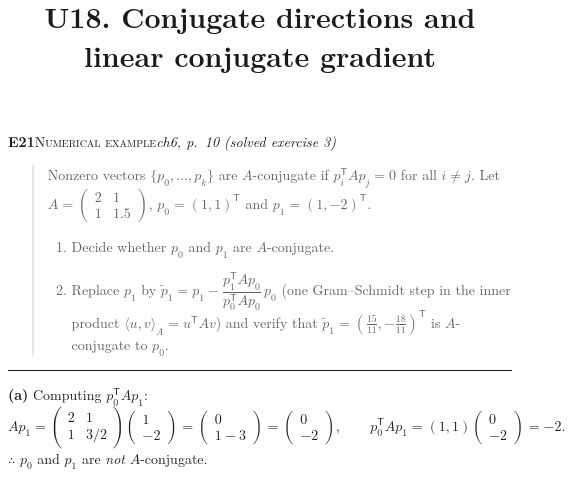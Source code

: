 \documentclass[11pt,a4paper]{article}
\title{U18. Conjugate directions and linear conjugate gradient}
\author{}
\date{}
\newcommand{\T}{^{\mathsf T}}
\newcommand{\task}[3]{\par\medskip\noindent\textbf{#1}\quad\textsc{#2}\hfill\textit{#3}\par\smallskip}
\newenvironment{statement}{\begin{quote}\small}{\end{quote}\vspace{-0.3em}\noindent\textcolor{gray}{\rule{\linewidth}{0.6pt}}\par\medskip}
\begin{document}
\maketitle
\vspace{-1.5cm}

\task{E21}{Numerical example}{ch6, p.\ 10 (solved exercise 3)}
\begin{statement}
Nonzero vectors $\{p_0,\dots,p_k\}$ are $A$-conjugate if $p_i\T A p_j=0$ for all $i\neq j$.
Let $A=\begin{pmatrix}2&1\\1&1.5\end{pmatrix}$, $p_0=(1,1)\T$ and $p_1=(1,-2)\T$.
\begin{enumerate}[label=\alph*)]
\item Decide whether $p_0$ and $p_1$ are $A$-conjugate.
\item Replace $p_1$ by $\tilde p_1=p_1-\dfrac{p_1\T A p_0}{p_0\T A p_0}\,p_0$ (one Gram--Schmidt step in the inner product $\langle u,v\rangle_A=u\T A v$) and verify that $\tilde p_1=(\tfrac{15}{11},-\tfrac{18}{11})\T$ is $A$-conjugate to $p_0$.
\end{enumerate}
\end{statement}

\textbf{(a)} Computing $p_0\T A p_1$:
\[
A p_1=\begin{pmatrix}2&1\\1&3/2\end{pmatrix}\begin{pmatrix}1\\-2\end{pmatrix}
=\begin{pmatrix}0\\1-3\end{pmatrix}=\begin{pmatrix}0\\-2\end{pmatrix},
\qquad
p_0\T A p_1=(1,1)\begin{pmatrix}0\\-2\end{pmatrix}=-2 .
\]
$\therefore$ $p_0$ and $p_1$ are \emph{not} $A$-conjugate.
\end{document}
